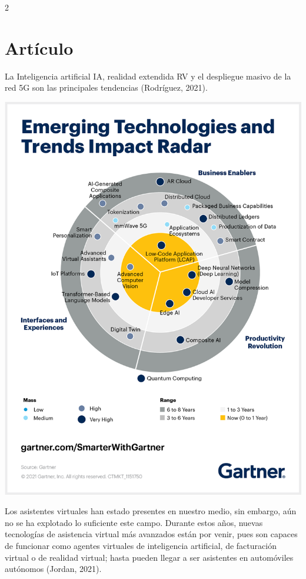 \documentclass[12pt,spanish,Letterpaper,openany]{book}
\begin{document}
\begin {multicols}{2}
\hypertarget{artuxedculo-5}{%
\section{Artículo}\label{artuxedculo-5}}

La Inteligencia artificial IA, realidad extendida RV y el despliegue masivo de la red 5G son las principales tendencias (Rodríguez, 2021).

\begin {flushleft}
\noindent\begin{minipage}[c]{\columnwidth}

\begin{center}\includegraphics[width=0.9\linewidth]{images/marco_01} \end{center}

\end{minipage}
\end {flushleft}

Los asistentes virtuales han estado presentes en nuestro medio, sin embargo, aún no se ha explotado lo suficiente este campo. Durante estos años, nuevas tecnologías de asistencia virtual más avanzados están por venir, pues son capaces de funcionar como agentes virtuales de inteligencia artificial, de facturación virtual o de realidad virtual; hasta pueden llegar a ser asistentes en automóviles autónomos (Jordan, 2021).


\end{multicols}
\end{document}
